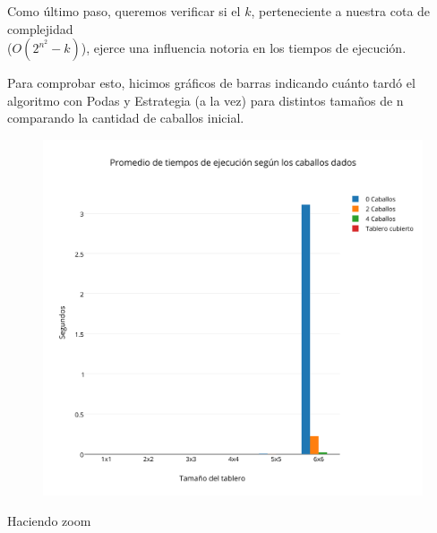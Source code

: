 
\newpage

Como último paso, queremos verificar si el $k$, perteneciente a nuestra cota de complejidad\\
($O(2^{n^2}-k)$), ejerce una influencia notoria en los tiempos de ejecución.

Para comprobar esto, hicimos gráficos de barras indicando cuánto tardó el algoritmo con Podas y Estrategia (a la vez) para distintos tamaños de n comparando la cantidad de caballos inicial.

\begin{figure}[h!]
   \begin{center}
\includegraphics[scale=0.3]{../src/ej3/Mediciones/Barras1.png} 
   \end{center}
 \end{figure}

\newpage
 
Haciendo zoom

